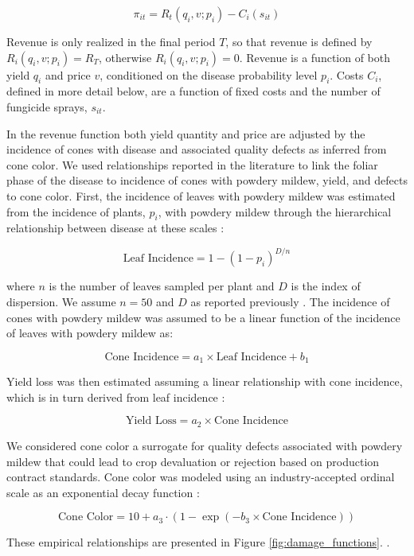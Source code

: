 \documentclass[10pt,a4paper]{article}
\begin{document}
$$\pi_{i t} = R_t(q_i,v; p_i) - C_i(s_{i t})$$

Revenue is only realized in the final period $T$, so that revenue is defined by $R_i(q_i,v; p_i) = R_T$, otherwise $R_i(q_i,v; p_i) = 0$. Revenue is a function of both yield $q_i$ and price $v$, conditioned on the disease probability level $p_i$. Costs $C_i$, defined in more detail below, are a function of fixed costs and the number of fungicide sprays, $s_{it}$.

In the revenue function both yield quantity and price are adjusted by the incidence of cones with disease and associated quality defects as inferred from cone color. We used relationships reported in the literature to link the foliar phase of the disease to incidence of cones with powdery mildew, yield, and defects to cone color. First, the incidence of leaves with powdery mildew was estimated from the incidence of plants, $p_i$, with powdery mildew through the hierarchical relationship between disease at these scales \parencite{Turechek2004}:

$$\text{Leaf Incidence} = 1-(1-p_i)^{D/n}$$

where $n$ is the number of leaves sampled per plant and $D$ is the index of dispersion. We assume $n = 50$ and $D$ as reported previously \parencite{Turechek2004}. The incidence of cones with powdery mildew was assumed to be a linear function of the incidence of leaves with powdery mildew \parencite{Turechek2001} as:

$$\text{Cone Incidence} = a_1 \times \text{Leaf Incidence} + b_1$$

Yield loss was then estimated assuming a linear relationship with cone incidence, which is in turn derived from leaf incidence  \parencite{Gent2014}:

$$\text{Yield Loss} = a_2 \times \text{Cone Incidence}$$

We considered cone color a surrogate for quality defects associated with powdery mildew that could lead to crop devaluation or rejection based on production contract standards. Cone color was modeled using an industry-accepted ordinal scale as an exponential decay function \parencite{Gent2014}:

$$\text{Cone Color} = 10 + a_3 \cdot (1 - \exp{\left(-b_3 \times \text{Cone Incidence}\right)})$$

These empirical relationships are presented in Figure \ref{fig:damage_functions}. .
\end{document}
